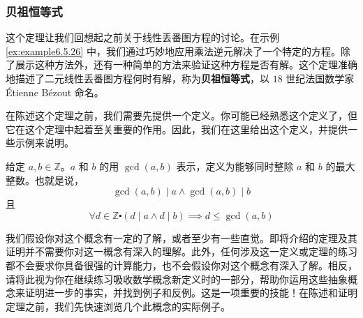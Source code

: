 \subsubsection*{贝祖恒等式}

这个定理让我们回想起之前关于线性丢番图方程的讨论。在示例 \ref{ex:example6.5.26} 中，我们通过巧妙地应用乘法逆元解决了一个特定的方程。除了展示这种方法外，还有一种简单的方法来验证这种方程是否有解。这个定理准确地描述了二元线性丢番图方程何时有解，称为\textbf{贝祖恒等式}，以 $18$ 世纪法国数学家 Étienne Bézout 命名。

在陈述这个定理之前，我们需要先提供一个定义。你可能已经熟悉这个定义了，但它在这个定理中起着至关重要的作用。因此，我们在这里给出这个定义，并提供一些示例来说明。

\begin{definition}[最大公约数]
    给定 $a,b \in \mathbb{Z}$。$a$ 和 $b$ 的用 $\gcd(a, b)$ 表示，定义为能够同时整除 $a$ 和 $b$ 的最大整数。也就是说，
    \[\gcd(a, b) \mid a \land \gcd(a, b) \mid b\]
    且
    \[\forall d \in \mathbb{Z} \centerdot (d \mid a \land d \mid b) \implies d \le \gcd(a, b)\]
\end{definition}

我们假设你对这个概念有一定的了解，或者至少有一些直觉。即将介绍的定理及其证明并不需要你对这一概念有深入的理解。此外，任何涉及这一定义或定理的练习都不会要求你具备很强的计算能力，也不会假设你对这个概念有深入了解。相反，请将此视为你在继续练习吸收数学概念新定义时的一部分，帮助你运用这些抽象概念来证明进一步的事实，并找到例子和反例。这是一项重要的技能！在陈述和证明定理之前，我们先快速浏览几个此概念的实际例子。\\

